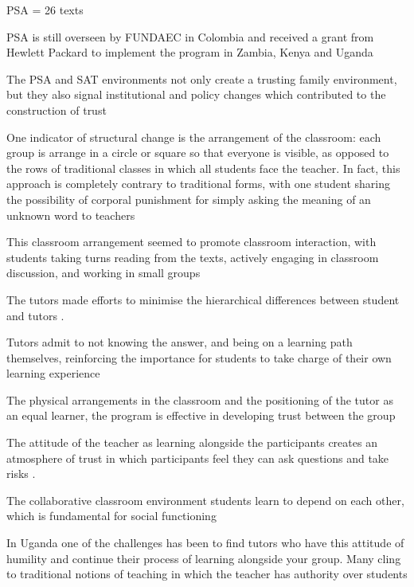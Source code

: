 PSA = 26 texts \citep{Murphy-Graham2014}

PSA is still overseen by FUNDAEC in Colombia and received a grant from Hewlett Packard to implement the program in Zambia, Kenya and Uganda \citep{Murphy-Graham2014}

The PSA and SAT environments not only create a trusting family environment, but they also signal institutional and policy changes which contributed to the construction of trust \citep{Murphy-Graham2014}

One indicator of structural change is the arrangement of the classroom: each group is arrange in a circle or square so that everyone is visible, as opposed to the rows of traditional classes in which all students face the teacher. In fact, this approach is completely contrary to traditional forms, with one student sharing the possibility of corporal punishment for simply asking the meaning of an unknown word to teachers \citep{Murphy-Graham2014}

This classroom arrangement seemed to promote classroom interaction, with students taking turns reading from the texts, actively engaging in classroom discussion, and working in small groups \citep{Murphy-Graham2014}

The tutors made efforts to minimise the hierarchical differences between student and tutors \citep{Murphy-Graham2014}.

Tutors admit to not knowing the answer, and being on a learning path themselves, reinforcing the importance for students to take charge of their own learning experience \citep{Murphy-Graham2014}

The physical arrangements in the classroom and the positioning of the tutor as an equal learner, the program is effective in developing trust between the group \citep{Murphy-Graham2014}

The attitude of the teacher as learning alongside the participants creates an atmosphere of trust in which participants feel they can ask questions and take risks \citep{Murphy-Graham2014}.

The collaborative classroom environment students learn to depend on each other, which is fundamental for social functioning \citep{Murphy-Graham2014}

In Uganda one of the challenges has been to find tutors who have this attitude of humility and continue their process of learning alongside your group. Many cling to traditional notions of teaching in which the teacher has authority over students \citep{Murphy-Graham2014}

